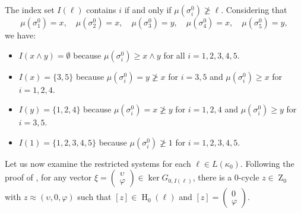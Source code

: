 \documentclass[a4paper,10pt]{article}
\DeclareMathOperator{\Zo}{Z}
\DeclareMathOperator{\Ho}{H}
\begin{document}
The index set \(I(\ell)\) contains \(i\) if and only if \(\mu(\sigma^{0}_{i})\not \geq \ell\). Considering that
\[
\mu(\sigma^0_1)=x, \quad \mu(\sigma^0_2)=x, \quad \mu(\sigma^0_3)=y, \quad \mu(\sigma^0_4)=x, \quad \mu(\sigma^0_5)=y,
\]
we have:
\begin{itemize}
\item \(I(x \wedge y) = \emptyset\) because \(\mu(\sigma^{0}_{i})\geq x \wedge y\) for all \(i=1,2,3,4,5\).
\item \(I(x) = \{3,5\}\) because \(\mu(\sigma^{0}_{i}) =y \not \geq x\) for \(i=3,5\) and \(\mu(\sigma^{0}_{i})\geq x\) for \(i=1,2,4\).
\item \(I(y) = \{1,2,4\}\) because \(\mu(\sigma^{0}_{i}) =x \not \geq y\) for \(i=1,2,4\) and \(\mu(\sigma^{0}_{i})\geq y\) for \(i=3,5\).
\item \(I(1) = \{1,2,3,4,5\}\) because \(\mu(\sigma^{0}_{i})\not \geq 1\) for \(i=1,2,3,4,5\).
\end{itemize}
Let us now examine the restricted systems for each \(\ell \in L(\kappa_0)\). 
Following the proof of , for any vector \(\xi=\left(
\begin{array}{c}
\upsilon \\ \varphi 
\end{array}\right) 
\in \ker G_{0,I(\ell)}\), there is a \(0\)-cycle \(z \in \Zo_0\) with \(z \approx (\upsilon,0,\varphi)\) such that \([z] \in \Ho_0(\ell)\) and 
\([z] = \left(
\begin{array}{c}
0 \\ \varphi 
\end{array}
\right)\).
\end{document}
